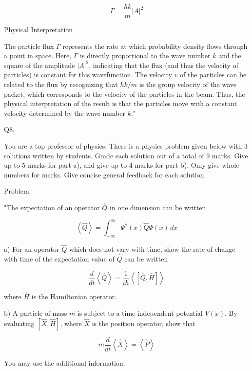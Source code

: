 \[ \Gamma = \frac{\hbar k}{m}|A|^2 \]

Physical Interpretation

The particle flux \( \Gamma \) represents the rate at which probability density flows through a point in space. Here, \( \Gamma \) is directly proportional to the wave number \( k \) and the square of the amplitude \( |A|^2 \), indicating that the flux (and thus the velocity of particles) is constant for this wavefunction. The velocity \( v \) of the particles can be related to the flux by recognizing that \( \hbar k/m \) is the group velocity of the wave packet, which corresponds to the velocity of the particles in the beam. Thus, the physical interpretation of the result is that the particles move with a constant velocity determined by the wave number \( k \)."



                           Q8. 

You are a top professor of physics. There is a physics problem given below with 3 solutions written by students. Grade each solution out of a total of 9 marks. Give up to 5 marks for part a), and give up to 4 marks for part b). Only give whole numbers for marks. Give concise general feedback for each solution. 

Problem:

"The expectation of an operator \( \hat{Q} \) in one dimension can be written 

\[ \left< \hat{Q} \right> = \int_{-\infty}^{\infty} \Psi^{*}(x) \hat{Q} \Psi(x) \, dx \]

a) For an operator \( \hat{Q} \) which does not vary with time, show the rate of change with time of the expectation value of \( \hat{Q} \) can be written

\[ \frac{d}{dt}\left<\hat{Q}\right> = \frac{1}{i\hbar}\left< \left[ \hat{Q}, \hat{H} \right] \right> \]

where \( \hat{H} \) is the Hamiltonian operator. 

b) A particle of mass \( m \) is subject to a time-independent potential \( V(x) \). By evaluating \( \left[ \hat{X}, \hat{H}\right] \), where \( \hat{X} \) is the position operator, show that 

\[ m\frac{d}{dt}\left<\hat{X}\right> = \left<\hat{P}\right> \]

You may use the additional information: 

